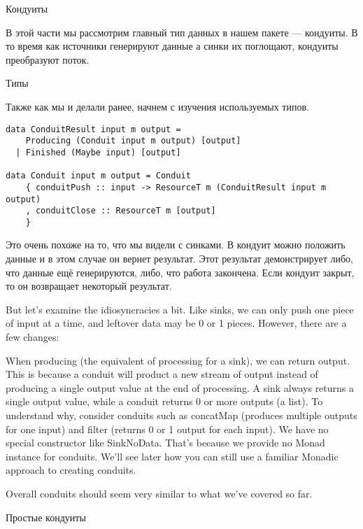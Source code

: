 Кондуиты

В этой части мы рассмотрим главный тип данных в нашем пакете --- кондуиты. В то время как
источники генерируют данные а синки их поглощают, кондуиты преобразуют поток.

Типы

Также как мы и делали ранее, начнем с изучения используемых типов.
\begin{lstlisting}
data ConduitResult input m output =
    Producing (Conduit input m output) [output]
  | Finished (Maybe input) [output]

data Conduit input m output = Conduit
    { conduitPush :: input -> ResourceT m (ConduitResult input m output)
    , conduitClose :: ResourceT m [output]
    }
\end{lstlisting}
Это очень похоже на то, что мы видели с синками. В кондуит можно положить данные и в этом
случае он вернет результат. Этот результат демонстрирует либо, что данные ещё
генерируются, либо, что работа закончена. Если кондуит закрыт, то он возвращает некоторый
результат.


But let's examine the idiosyncracies a bit. Like sinks, we can only push one piece of
input at
a time, and leftover data may be 0 or 1 pieces. However, there are a few changes:

  
When producing (the equivalent of processing for a sink), we can return output. This is
because a conduit will product a new stream of output instead of producing a single
output
value
at the end of processing.
A sink always returns a single output value, while a conduit returns 0 or more outputs
(a
list). To understand why, consider conduits such as concatMap (produces
multiple outputs for one input) and filter (returns 0 or 1 output for each
input).
We have no special constructor like SinkNoData. That's because we provide no
Monad instance for conduits. We'll see later how you can still use a familiar
Monadic approach to creating conduits.
  
Overall conduits should seem very similar to what we've covered so far.

Простые кондуиты

